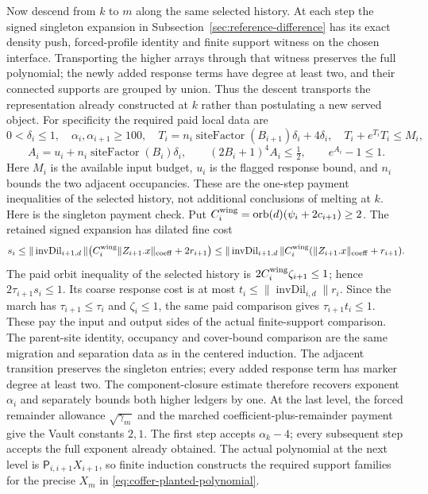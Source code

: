 Now descend from $k$ to $m$ along the same selected history. At each
step the signed singleton expansion in Subsection~\ref{sec:reference-difference}
has its exact density push, forced-profile identity and finite support
witness on the chosen interface. Transporting the higher arrays through that
witness preserves the full polynomial; the newly added response terms
have degree at least two, and their connected supports are grouped by
union. Thus the descent transports the representation already
constructed at $k$ rather than postulating a new served object.
For specificity the required paid local data are
\[
 0<\delta_i\le1,\quad \alpha_i,\alpha_{i+1}\ge100,\quad
 T_i=n_i\operatorname{siteFactor}(B_{i+1})\delta_i+4\delta_i,
 \quad T_i+e^{T_i}T_i\le M_i,
\]
\[
 A_i=u_i+n_i\operatorname{siteFactor}(B_i)\delta_i,
 \qquad (2B_i+1)^4A_i\le\tfrac12,
 \qquad e^{A_i}-1\le1.
\]
Here $M_i$ is the available input budget, $u_i$ is the flagged
response bound, and $n_i$ bounds the two adjacent occupancies. These
are the one-step payment inequalities of the selected history, not
additional conclusions of melting at $k$.
Here is the singleton payment check. Put
$C_i^{\rm wing}=\operatorname{orb}(d)(\psi_i+2c_{i+1})\ge2$.
The retained signed expansion has dilated fine cost
\[
 s_i\le\|\operatorname{invDil}_{i+1,d}\|
       \bigl(C_i^{\rm wing}\|Z_{i+1}.x\|_{\rm coeff}
                    +2r_{i+1}\bigr)
 \le \|\operatorname{invDil}_{i+1,d}\|C_i^{\rm wing}
          (\|Z_{i+1}.x\|_{\rm coeff}+r_{i+1}).
\]
The paid orbit inequality of the selected history is
$2C_i^{\rm wing}\zeta_{i+1}\le1$; hence
$2\tau_{i+1}s_i\le1$. Its coarse response cost is at most
$t_i\le\|\operatorname{invDil}_{i,d}\|r_i$. Since the march has
$\tau_{i+1}\le\tau_i$ and $\zeta_i\le1$, the same paid comparison
gives $\tau_{i+1}t_i\le1$. These pay the input and output sides of the actual finite-support
comparison. The parent-site identity, occupancy and cover-bound
comparison are the same migration and separation data as in the
centered induction. The adjacent transition preserves the singleton
entries; every added response term has marker degree at least two.
The component-closure estimate therefore recovers exponent $\alpha_i$
and separately bounds both higher ledgers by one. At the last level, the forced remainder allowance
$\sqrt{\gamma_m}$ and the marched coefficient-plus-remainder
payment give the Vault constants $2,1$. The first step accepts
$\alpha_k-4$; every subsequent step accepts the full exponent
already obtained. The actual polynomial at the next level is
$\mathsf P_{i,i+1}X_{i+1}$, so finite induction constructs the
required support families for the precise $X_m$ in
\eqref{eq:coffer-planted-polynomial}.

